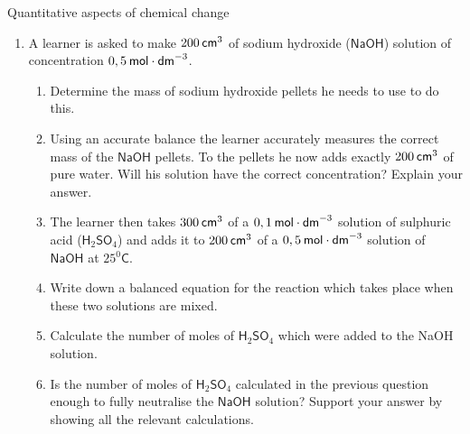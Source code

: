 \begin{eocexercises}{Quantitative aspects of chemical change}
\begin{enumerate}[noitemsep, label=\textbf{\arabic*}. ]
\label{m38712*id286663}\begin{enumerate}[noitemsep, label=\textbf{\alph*}. ] 
            \label{m38712*uid148}\item Write down a balanced equation for the reaction which takes place when these two solutions are mixed.
\label{m38712*uid149}\item Calculate the number of moles of sulphuric acid which were added to the sodium hydroxide solution.
\label{m38712*uid150}\item Is the number of moles of sulphuric acid enough to fully neutralise the sodium hydroxide solution? Support your answer by showing all relevant calculations.
(IEB Paper 2 2004)
\end{enumerate}
                \label{m38712*uid155}\item A learner is asked to make $200\phantom{\rule{2pt}{0ex}}{\mathsf{cm}}^{3}$ of sodium hydroxide ($\mathsf{NaOH}$) solution of concentration $0,5\phantom{\rule{2pt}{0ex}}\mathsf{mol}\ensuremath{\cdot}{\mathsf{dm}}^{-3}$.
\label{m38712*id286969}\begin{enumerate}[noitemsep, label=\textbf{\alph*}. ] 
            \label{m38712*uid156}\item Determine the mass of sodium hydroxide pellets he needs to use to do this.
\label{m38712*uid157}\item Using an accurate balance the learner accurately measures the correct mass of the $\mathsf{NaOH}$ pellets. To the pellets he now adds exactly $200\phantom{\rule{2pt}{0ex}}{\mathsf{cm}}^{3}$ of pure water. Will his solution have the correct concentration? Explain your answer.\item The learner then takes $300\phantom{\rule{2pt}{0ex}}{\mathsf{cm}}^{3}$ of a $0,1\phantom{\rule{2pt}{0ex}}\mathsf{mol}\ensuremath{\cdot}{\mathsf{dm}}^{-3}$ solution of sulphuric acid ($\mathsf{H}{}_{2}\mathsf{SO}{}_{4}$) and adds it to $200\phantom{\rule{2pt}{0ex}}{\mathsf{cm}}^{3}$ of a $0,5\phantom{\rule{2pt}{0ex}}\mathsf{mol}\ensuremath{\cdot}{\mathsf{dm}}^{-3}$ solution of $\mathsf{NaOH}$ at $25{}^{0}\mathsf{C}$.
\label{m38712*uid158}\item Write down a balanced equation for the reaction which takes place when these two solutions are mixed.
\label{m38712*uid159}\item Calculate the number of moles of $\mathsf{H}{}_{2}\mathsf{SO}{}_{4}$ which were added to the NaOH solution.
\label{m38712*uid160}\item Is the number of moles of $\mathsf{H}{}_{2}\mathsf{SO}{}_{4}$ calculated in the previous question enough to fully neutralise the $\mathsf{NaOH}$ solution? Support your answer by showing all the relevant calculations.

\end{enumerate}
\end{enumerate}
\end{eocexercises}
